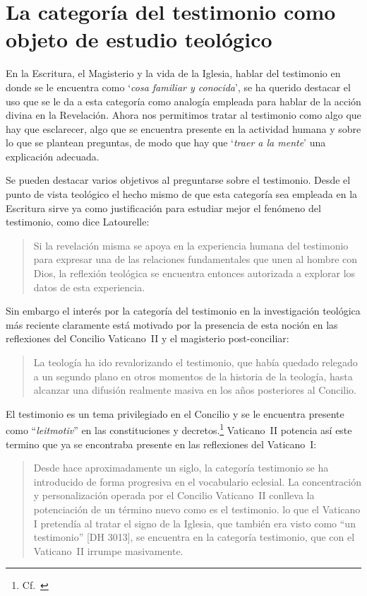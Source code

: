 \section{La categoría del testimonio como objeto de estudio teológico}

En la Escritura, el Magisterio y la vida de la Iglesia, hablar del testimonio en donde se le encuentra como \enquote*{\emph{cosa familiar y conocida}}, se ha querido destacar el uso que se le da a esta categoría como analogía empleada para hablar de la acción divina en la Revelación. Ahora nos permitimos tratar al testimonio como algo que hay que esclarecer, algo que se encuentra presente en la actividad humana y sobre lo que se plantean preguntas, de modo que hay que \enquote*{\emph{traer a la mente}} una explicación adecuada.

Se pueden destacar varios objetivos al preguntarse sobre el testimonio. Desde el punto de vista teológico el hecho mismo de que esta categoría sea empleada en la Escritura sirve ya como justificación para estudiar mejor el fenómeno del testimonio, como dice Latourelle: \blockquote[{\cite[1523]{latourelle2000testimonio}}]{Si la revelación misma se apoya en la experiencia humana del testimonio para expresar una de las relaciones fundamentales que unen al hombre con Dios, la reflexión teológica se encuentra entonces autorizada a explorar los datos de esta experiencia.} Sin embargo el interés por la categoría del testimonio en la investigación teológica más reciente claramente está motivado por la presencia de esta noción en las reflexiones del Concilio Vaticano~II y el magisterio post-conciliar: \blockquote[{\cite[81]{prades2015testimonio}}]{La teología ha ido revalorizando el testimonio, que había quedado relegado a un segundo plano en otros momentos de la historia de la teología, hasta alcanzar una difusión realmente masiva en los años posteriores al Concilio.} El testimonio es un tema privilegiado en el Concilio y se le encuentra presente como \enquote{\emph{leitmotiv}} en las constituciones y decretos.\footnote{Cf.~\cite[1523]{latourelle2000testimonio}} Vaticano~II potencia así este termino que ya se encontraba presente en las reflexiones del Vaticano~I: \blockquote[{\cite[572]{ninot2009tf}}]{Desde hace aproximadamente un siglo, la categoría testimonio se ha introducido de forma progresiva en el vocabulario eclesial. La concentración y personalización operada por el Concilio Vaticano~II conlleva la potenciación de un término nuevo como es el testimonio. \textelp{} lo que el Vaticano I pretendía al tratar el signo de la Iglesia, que también era visto como ``un testimonio'' [DH 3013], se encuentra en la categoría testimonio, que con el Vaticano~II irrumpe masivamente.}

